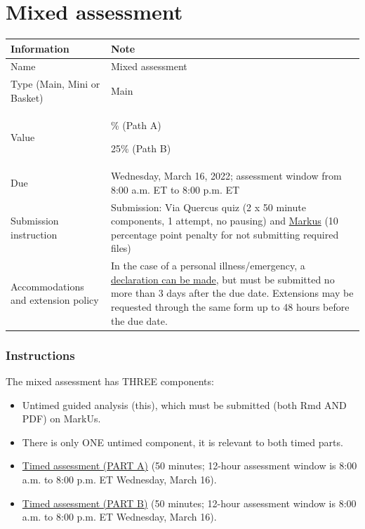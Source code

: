 \documentclass[
  openany]{book}
\providecommand{\tightlist}{%
  \setlength{\itemsep}{0pt}\setlength{\parskip}{0pt}}
\begin{document}
\hypertarget{mixed-assessment}{%
\chapter{Mixed assessment}\label{mixed-assessment}}

\begin{longtable}[]{@{}
  >{\raggedright\arraybackslash}p{}
  >{\raggedright\arraybackslash}p{}@{}}
\toprule
\textbf{Information} & \textbf{Note} \\
\midrule
\endhead
Name & Mixed assessment \\
Type (Main, Mini or Basket) & Main \\
Value & 20\% (Path A)

25\% (Path B) \\
Due & Wednesday, March 16, 2022; assessment window from 8:00 a.m. ET to 8:00 p.m. ET \\
Submission instruction & Submission: Via Quercus quiz (2 x 50 minute components, 1 attempt, no pausing) and \href{https://markus-ds.teach.cs.toronto.edu/}{Markus} (10 percentage point penalty for not submitting required files) \\
Accommodations and extension policy & In the case of a personal illness/emergency, a \href{https://forms.office.com/Pages/ResponsePage.aspx?id=JsKqeAMvTUuQN7RtVsVSEOKHUU3SzAJJhmOKjJhDWEpUNTFDSzhZTFlXUzVYMVlNM1FEUTRZMkVWOC4u}{declaration can be made}, but must be submitted no more than 3 days after the due date. Extensions may be requested through the same form up to 48 hours before the due date. \\
\bottomrule
\end{longtable}

\hypertarget{instructions-2}{%
\subsection{Instructions}\label{instructions-2}}

The mixed assessment has THREE components:

\begin{itemize}
\tightlist
\item
  Untimed guided analysis (this), which must be submitted (both Rmd AND PDF) on MarkUs.
\item
  There is only ONE untimed component, it is relevant to both timed parts.
\item
  \href{https://q.utoronto.ca/courses/253305/quizzes/237354}{Timed assessment (PART A)} (50 minutes; 12-hour assessment window is 8:00 a.m. to 8:00 p.m. ET Wednesday, March 16).
\item
  \href{https://q.utoronto.ca/courses/253305/quizzes/237355}{Timed assessment (PART B)} (50 minutes; 12-hour assessment window is 8:00 a.m. to 8:00 p.m. ET Wednesday, March 16).
\end{itemize}
\end{document}
